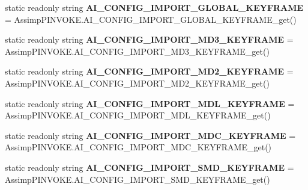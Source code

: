 \begin{DoxyCompactItemize}
\item 
\hypertarget{class_assimp_a699ca1e4b8f1adc5821ad03b42619fe8}{static readonly string {\bfseries A\+I\+\_\+\+C\+O\+N\+F\+I\+G\+\_\+\+I\+M\+P\+O\+R\+T\+\_\+\+G\+L\+O\+B\+A\+L\+\_\+\+K\+E\+Y\+F\+R\+A\+M\+E} = Assimp\+P\+I\+N\+V\+O\+K\+E.\+A\+I\+\_\+\+C\+O\+N\+F\+I\+G\+\_\+\+I\+M\+P\+O\+R\+T\+\_\+\+G\+L\+O\+B\+A\+L\+\_\+\+K\+E\+Y\+F\+R\+A\+M\+E\+\_\+get()}\label{class_assimp_a699ca1e4b8f1adc5821ad03b42619fe8}

\item 
\hypertarget{class_assimp_a21b453cb92cb63f5b5491395da2e9dca}{static readonly string {\bfseries A\+I\+\_\+\+C\+O\+N\+F\+I\+G\+\_\+\+I\+M\+P\+O\+R\+T\+\_\+\+M\+D3\+\_\+\+K\+E\+Y\+F\+R\+A\+M\+E} = Assimp\+P\+I\+N\+V\+O\+K\+E.\+A\+I\+\_\+\+C\+O\+N\+F\+I\+G\+\_\+\+I\+M\+P\+O\+R\+T\+\_\+\+M\+D3\+\_\+\+K\+E\+Y\+F\+R\+A\+M\+E\+\_\+get()}\label{class_assimp_a21b453cb92cb63f5b5491395da2e9dca}

\item 
\hypertarget{class_assimp_a535c1b203bd78563870eb2b04b525ac0}{static readonly string {\bfseries A\+I\+\_\+\+C\+O\+N\+F\+I\+G\+\_\+\+I\+M\+P\+O\+R\+T\+\_\+\+M\+D2\+\_\+\+K\+E\+Y\+F\+R\+A\+M\+E} = Assimp\+P\+I\+N\+V\+O\+K\+E.\+A\+I\+\_\+\+C\+O\+N\+F\+I\+G\+\_\+\+I\+M\+P\+O\+R\+T\+\_\+\+M\+D2\+\_\+\+K\+E\+Y\+F\+R\+A\+M\+E\+\_\+get()}\label{class_assimp_a535c1b203bd78563870eb2b04b525ac0}

\item 
\hypertarget{class_assimp_a24682b2fdc945eb7f2744630ba15fc1c}{static readonly string {\bfseries A\+I\+\_\+\+C\+O\+N\+F\+I\+G\+\_\+\+I\+M\+P\+O\+R\+T\+\_\+\+M\+D\+L\+\_\+\+K\+E\+Y\+F\+R\+A\+M\+E} = Assimp\+P\+I\+N\+V\+O\+K\+E.\+A\+I\+\_\+\+C\+O\+N\+F\+I\+G\+\_\+\+I\+M\+P\+O\+R\+T\+\_\+\+M\+D\+L\+\_\+\+K\+E\+Y\+F\+R\+A\+M\+E\+\_\+get()}\label{class_assimp_a24682b2fdc945eb7f2744630ba15fc1c}

\item 
\hypertarget{class_assimp_ae8ab24d393a80009e8bccc578da13393}{static readonly string {\bfseries A\+I\+\_\+\+C\+O\+N\+F\+I\+G\+\_\+\+I\+M\+P\+O\+R\+T\+\_\+\+M\+D\+C\+\_\+\+K\+E\+Y\+F\+R\+A\+M\+E} = Assimp\+P\+I\+N\+V\+O\+K\+E.\+A\+I\+\_\+\+C\+O\+N\+F\+I\+G\+\_\+\+I\+M\+P\+O\+R\+T\+\_\+\+M\+D\+C\+\_\+\+K\+E\+Y\+F\+R\+A\+M\+E\+\_\+get()}\label{class_assimp_ae8ab24d393a80009e8bccc578da13393}

\item 
\hypertarget{class_assimp_a02c786ec1ff6b135000c2cf36a574ae2}{static readonly string {\bfseries A\+I\+\_\+\+C\+O\+N\+F\+I\+G\+\_\+\+I\+M\+P\+O\+R\+T\+\_\+\+S\+M\+D\+\_\+\+K\+E\+Y\+F\+R\+A\+M\+E} = Assimp\+P\+I\+N\+V\+O\+K\+E.\+A\+I\+\_\+\+C\+O\+N\+F\+I\+G\+\_\+\+I\+M\+P\+O\+R\+T\+\_\+\+S\+M\+D\+\_\+\+K\+E\+Y\+F\+R\+A\+M\+E\+\_\+get()}\label{class_assimp_a02c786ec1ff6b135000c2cf36a574ae2}


\end{DoxyCompactItemize}

